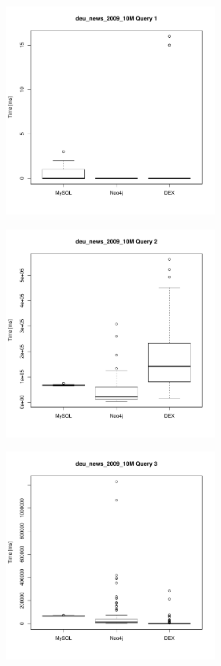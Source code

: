 \documentclass[11pt, a4paper, oneside]{article} %
\begin{document}
\begin{appendix}
\begin{landscape}
\begin{figure}[ht]
		\begin{minipage}[hbt]{6.5cm}
			\centering
			\includegraphics[width=7cm]{../results/cold caches/images/10M_query1_boxplot}
			\label{fig:10M_query1_boxplot}
		\end{minipage}
		\hfill
		\begin{minipage}[hbt]{6.5cm}
			\centering
			\includegraphics[width=7cm]{../results/cold caches/images/10M_query2_boxplot}
			\label{fig:10M_query2_boxplot}
		\end{minipage}
		\hfill
		\begin{minipage}[hbt]{6.5cm}
			\centering
			\includegraphics[width=7cm]{../results/cold caches/images/10M_query3_boxplot}
			\label{fig:10M_query3_boxplot}
		\end{minipage}
	\end{figure}
\end{landscape}


\end{appendix}
\end{document}
